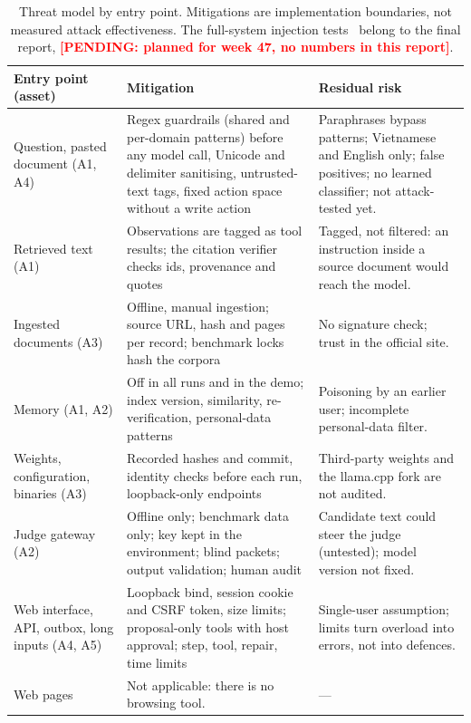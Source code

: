 \documentclass[a4paper,11pt]{article}
\newcommand{\pending}[1]{\textcolor{red}{\textbf{[PENDING: #1]}}}
\newcommand{\tabstyle}{\centering\small\renewcommand{\arraystretch}{1.1}\setlength{\tabcolsep}{4pt}}
\begin{document}
\begin{table}[!htbp]\tabstyle
\begin{tabularx}{\textwidth}{@{}L{3.0cm}L{6.3cm}Y@{}}
\toprule Entry point (asset) & Mitigation & Residual risk\\\midrule
Question, pasted document (A1, A4) & Regex guardrails (shared and per-domain patterns) before any model call, Unicode and delimiter sanitising, untrusted-text tags, fixed action space without a write action & Paraphrases bypass patterns; Vietnamese and English only; false positives; no learned classifier; not attack-tested yet.\\
Retrieved text (A1) & Observations are tagged as tool results; the citation verifier checks ids, provenance and quotes & Tagged, not filtered: an instruction inside a source document would reach the model.\\
Ingested documents (A3) & Offline, manual ingestion; source URL, hash and pages per record; benchmark locks hash the corpora & No signature check; trust in the official site.\\
Memory (A1, A2) & Off in all runs and in the demo; index version, similarity, re-verification, personal-data patterns & Poisoning by an earlier user; incomplete personal-data filter.\\
Weights, configuration, binaries (A3) & Recorded hashes and commit, identity checks before each run, loopback-only endpoints & Third-party weights and the llama.cpp fork are not audited.\\
Judge gateway (A2) & Offline only; benchmark data only; key kept in the environment; blind packets; output validation; human audit & Candidate text could steer the judge (untested); model version not fixed.\\
Web interface, API, outbox, long inputs (A4, A5) & Loopback bind, session cookie and CSRF token, size limits; proposal-only tools with host approval; step, tool, repair, time limits & Single-user assumption; limits turn overload into errors, not into defences.\\
Web pages & Not applicable: there is no browsing tool. & ---\\
\bottomrule\end{tabularx}
\caption{Threat model by entry point. Mitigations are implementation boundaries, not measured attack effectiveness. The full-system injection tests~\citep{greshake2023indirect,debenedetti2024agentdojo} belong to the final report, \pending{planned for week 47, no numbers in this report}.}\label{tab:threat}
\end{table}
\end{document}
